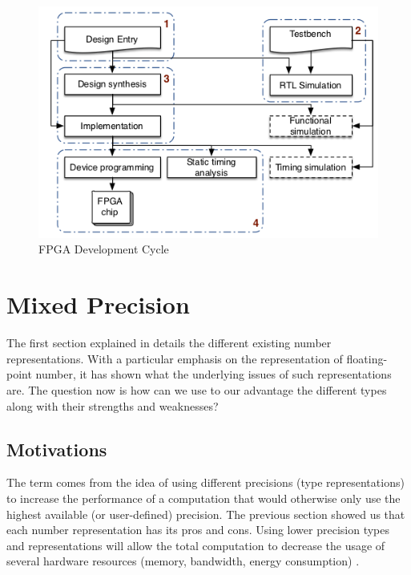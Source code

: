 \begin{figure}[htbp]
	\centering
		\includegraphics[width=\textwidth]{Figures/FPGACycle.png}
	\caption[FPGA Development Cycle]{FPGA Development Cycle \cite{XuanSang2014}}
	\label{fig:FPGACycle}
\end{figure}



\section{Mixed Precision}

The first section explained in details the different existing number representations. With a particular emphasis on the representation of floating-point number, it has shown what the underlying issues of such representations are. The question now is how can we use to our advantage the different types along with their strengths and weaknesses?

\subsection{Motivations}

The term  comes from the idea of using different precisions (type representations) to increase the performance of a computation that would otherwise only use the highest available (or user-defined) precision. The previous section showed us that each number representation has its pros and cons. Using lower precision types and representations will allow the total computation to decrease the usage of several hardware resources (memory, bandwidth, energy consumption) \cite{Horowitz2014,Nips2015}.

